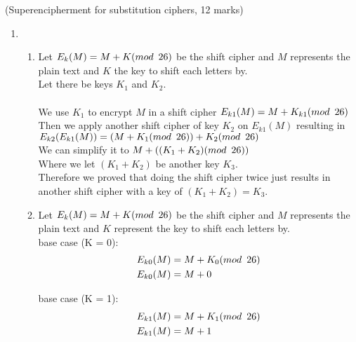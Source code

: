 \documentclass{assignment}
\begin{document}
\begin{problemlist}
\pbitem (Superencipherment for substitution ciphers, 12 marks)
\begin{problem}
\begin{answer}
\begin{enumerate}[label=(\alph*)]
	\item	\begin{enumerate}[label=(\roman*)]
			\item Let $ E_k(M) = M + K (mod \hspace{.5em} 26) $ be the shift cipher and $M$ represents the plain text 
				  and $K$ the key to shift each letters by. \\
				  Let there be keys $K_1$ and $K_2$. \\
				  \\
				  We use $K_1$ to encrypt $M$ in a shift cipher $E_{k1}(M) =  M + K_{k1} (mod \hspace{.5em} 26) $ \\
				  Then we apply another shift cipher of key $K_2$ on $E_{k1}(M)$ resulting in $E_{k2}(E_{k1}(M)) = (M + K_{1} (mod \hspace{.5em} 26)) + K_{2} (mod \hspace{.5em} 26) $ \\
				  We can simplify it to $M + ((K_{1} + K_{2}) (mod \hspace{.5em} 26)) $ \\
				  Where we let $(K_1 + K_2)$ be another key $K_3$. \\
				  Therefore we proved that doing the shift cipher twice just results in another shift cipher with a key of $(K_1 + K_2)=K_3$. \\

			
\clearpage				  
				
			\item Let $ E_k(M) = M + K (mod \hspace{.5em} 26) $ be the shift cipher and $M$ represents the plain text 
				  and $K$ represent the key to shift each letters by. \\
				base case (K = 0): 
				\begin{align*}
					E_{k0}(M) &= M + K_0  (mod \hspace{.5em} 26) \\
					E_{k0}(M) &= M + 0
				\end{align*}
				
				base case (K = 1): 
				\begin{align*}
					E_{k1}(M) &= M + K_1  (mod \hspace{.5em} 26) \\
					E_{k1}(M) &= M + 1
				\end{align*}


\end{enumerate}
\end{enumerate}
\end{answer}
\end{problem}
\end{problemlist}
\end{document}
